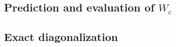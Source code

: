 \documentclass[reprint,amsmath,amssymb,aps,prb]{revtex4-2}
\begin{document}
\begin{widetext}
\subsection{Prediction and evaluation of $W_c$}


\subsection{Exact diagonalization}

%
\end{widetext}
\end{document}
